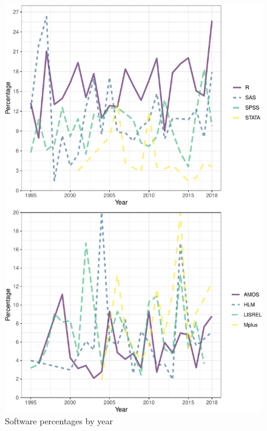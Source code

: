 \documentclass[english,,man]{apa6}
\theoremstyle{definition}
\theoremstyle{definition}
\theoremstyle{definition}
\theoremstyle{remark}
\begin{document}
\begin{figure}
\centering
\includegraphics{software_files/figure-latex/software-year-at1-1.pdf}
\caption{\label{fig:software-year-at1}Software percentages by year}
\end{figure}
\end{document}

